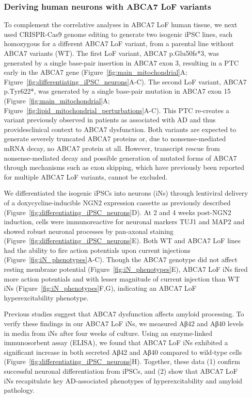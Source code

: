 \subsubsection{Deriving human neurons with ABCA7 LoF variants}
To complement the correlative analyses in ABCA7 LoF human tissue, we next used CRISPR-Cas9 genome editing to generate two isogenic iPSC lines, each homozygous for a different ABCA7 LoF variant, from a parental line without ABCA7 variants (WT). The first LoF variant, ABCA7 p.Glu50fs*3, was generated by a single base-pair insertion in ABCA7 exon 3, resulting in a PTC early in the ABCA7 gene (Figure~\ref{fig:main_mitochondrial}A; Figure~\ref{fig:differentiating_iPSC_neurons}A-C). The second LoF variant, ABCA7 p.Tyr622*, was generated by a single base-pair mutation in ABCA7 exon 15 (Figure~\ref{fig:main_mitochondrial}A; Figure~\ref{fig:lipid_mitochondrial_perturbations}A-C). This PTC re-creates a variant previously observed in patients as associated with AD \cite{Steinberg2015-mu} and thus providesclinical context to ABCA7 dysfunction. Both variants are expected to generate severely truncated ABCA7 proteins or, due to nonsense-mediated mRNA decay, no ABCA7 protein at all. However, transcript rescue from nonsense-mediated decay and possible generation of mutated forms of ABCA7 through mechanisms such as exon skipping, which have previously been reported for multiple ABCA7 LoF variants\cite{De_Roeck2017-hv}, cannot be excluded.

We differentiated the isogenic iPSCs into neurons (iNs) through lentiviral delivery of a doxycycline-inducible NGN2 expression cassette as previously described\cite{Ho2016-kz} (Figure~\ref{fig:differentiating_iPSC_neurons}D). At 2 and 4 weeks post-NGN2 induction, cells were immunoreactive for neuronal markers TUJ1 and MAP2 and showed robust neuronal processes by pan-axonal staining (Figure~\ref{fig:differentiating_iPSC_neurons}E). Both WT and ABCA7 LoF lines had the ability to fire action potentials upon current injections (Figure~\ref{fig:iN_phenotypes}A-C). Though the ABCA7 genotype did not affect resting membrane potential (Figure~\ref{fig:iN_phenotypes}E), ABCA7 LoF iNs fired more action potentials and with lesser magnitude of current injection than WT iNs (Figure~\ref{fig:iN_phenotypes}F,G), indicating an ABCA7 LoF hyperexcitability phenotype. 

Previous studies suggest that ABCA7 dysfunction affects amyloid processing\cite{Satoh2015-yu,Sakae2016-uy,Bamji-Mirza2018-xt,Chan2008-qu,De_Roeck2018-zx}. To verify these findings in our ABCA7 LoF iNs, we measured Aβ42 and Aβ40 levels in media from iNs after four weeks of culture. Using an enzyme-linked immunosorbent assay (ELISA), we found that ABCA7 LoF iNs exhibited a significant increase in both secreted Aβ42 and Aβ40 compared to wild-type cells (Figure~\ref{fig:differentiating_iPSC_neurons}H). Together, these data (1) confirm successful neuronal differentiation from iPSCs, and (2) show that ABCA7 LoF iNs recapitulate key AD-associated phenotypes of hyperexcitability and amyloid pathology.

